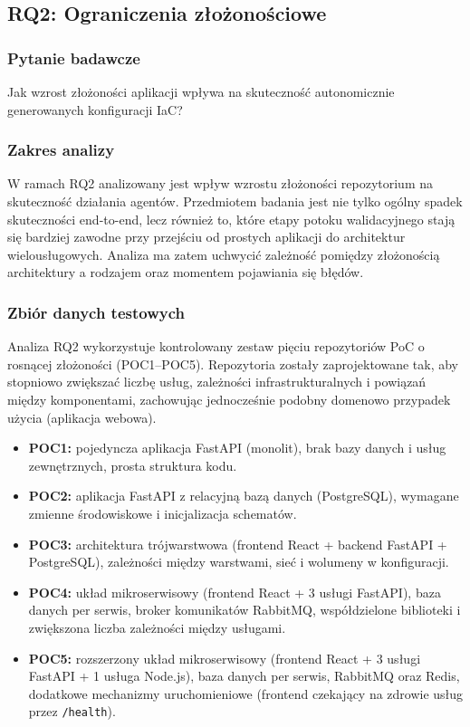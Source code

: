 \subsection{RQ2: Ograniczenia złożonościowe}

\subsubsection{Pytanie badawcze}

Jak wzrost złożoności aplikacji wpływa na skuteczność autonomicznie generowanych konfiguracji IaC?

\subsubsection{Zakres analizy}

W ramach RQ2 analizowany jest wpływ wzrostu złożoności repozytorium na skuteczność działania agentów. Przedmiotem badania jest nie tylko ogólny spadek skuteczności end-to-end, lecz również to, które etapy potoku walidacyjnego stają się bardziej zawodne przy przejściu od prostych aplikacji do architektur wielousługowych. Analiza ma zatem uchwycić zależność pomiędzy złożonością architektury a rodzajem oraz momentem pojawiania się błędów.

\subsubsection{Zbiór danych testowych}

Analiza RQ2 wykorzystuje kontrolowany zestaw pięciu repozytoriów PoC o rosnącej złożoności (POC1–POC5). Repozytoria zostały zaprojektowane tak, aby stopniowo zwiększać liczbę usług, zależności infrastrukturalnych i powiązań między komponentami, zachowując jednocześnie podobny domenowo przypadek użycia (aplikacja webowa).

\begin{itemize}
    \item \textbf{POC1:} pojedyncza aplikacja FastAPI (monolit), brak bazy danych i usług zewnętrznych, prosta struktura kodu.
    \item \textbf{POC2:} aplikacja FastAPI z relacyjną bazą danych (PostgreSQL), wymagane zmienne środowiskowe i inicjalizacja schematów.
    \item \textbf{POC3:} architektura trójwarstwowa (frontend React + backend FastAPI + PostgreSQL), zależności między warstwami, sieć i wolumeny w konfiguracji.
    \item \textbf{POC4:} układ mikroserwisowy (frontend React + 3 usługi FastAPI), baza danych per serwis, broker komunikatów RabbitMQ, współdzielone biblioteki i zwiększona liczba zależności między usługami.
    \item \textbf{POC5:} rozszerzony układ mikroserwisowy (frontend React + 3 usługi FastAPI + 1 usługa Node.js), baza danych per serwis, RabbitMQ oraz Redis, dodatkowe mechanizmy uruchomieniowe (frontend czekający na zdrowie usług przez \texttt{/health}).
\end{itemize}

